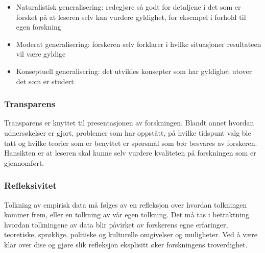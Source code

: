\begin{itemize}
\item Naturalistisk generalisering: redegjøre så godt for detaljene i det som er forsket på at leseren selv kan vurdere gyldighet, for eksempel i forhold til egen forskning
\item Moderat generalisering: forskeren selv forklarer i hvilke situasjoner resultateen vil være gyldige
\item Konseptuell generalisering: det utvikles konsepter som har gyldighet utover det som er studert
\end{itemize}

\subsubsection{Transparens}
Transparens er knyttet til presentasjonen av forskningen. Blandt annet hvordan udnersøkelser er gjort, problemer som har oppstått, på hvilke tidspunt valg ble tatt og hvilke teorier som er benyttet er spørsmål som bør besvares av forskeren. Hansikten er at leseren skal kunne selv vurdere kvaliteten på forskningen som er gjennomført. 

\subsubsection{Refleksivitet}
Tolkning av empirisk data må følges av en refleksjon over hvordan tolkningen kommer frem, eller en tolkning av vår egen tolkning. Det må tas i betraktning hvordan tolkningene av data blir påvirket av forskerens egne erfaringer, teoretiske, sprøklige, politiske og kulturelle omgivelser og muligheter. Ved å være klar over dise og gjøre slik refleksjon eksplisitt øker forskningens troverdighet. 

